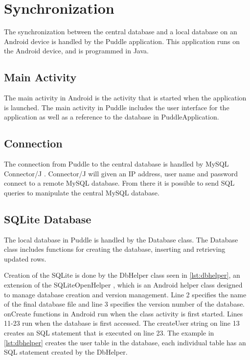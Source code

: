 \section{Synchronization}
The synchronization between the central database and a local database on an Android device is handled by the Puddle application. This application runs on the Android device, and is programmed in Java.

\subsection{Main Activity}
The main activity in Android is the activity that is started when the application is launched. The main activity in Puddle includes the user interface for the application as well as a reference to the database in PuddleApplication.

\subsection{Connection}
The connection from Puddle to the central database is handled by MySQL Connector/J \citep{mysqlconnectorj}. Connector/J will given an IP address, user name and password connect to a remote MySQL database. From there it is possible to send SQL queries to manipulate the central MySQL database.

\subsection{SQLite Database}
The local database in Puddle is handled by the Database class. The Database class includes functions for creating the database, inserting and retrieving updated rows.

Creation of the SQLite is done by the DbHelper class seen in \autoref{lst:dbhelper}, an extension of the SQLiteOpenHelper \citep{sqliteopenhelper}, which is an Android helper class designed to manage database creation and version management. Line 2 specifies the name of the final database file and line 3 specifies the version number of the database.
onCreate functions in Android run when the class activity is first started. Lines 11-23 run when the database is first accessed. The createUser string on line 13 creates an SQL statement that is executed on line 23. The example in \autoref{lst:dbhelper} creates the user table in the database, each individual table has an SQL statement created by the DbHelper.



